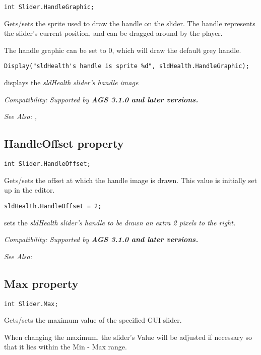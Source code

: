 \begin{verbatim}
int Slider.HandleGraphic;
\end{verbatim}
Gets/sets the sprite used to draw the handle on the slider. The handle represents the
slider's current position, and can be dragged around by the player.

The handle graphic can be set to 0, which will draw the default grey handle.

\begin{verbatim}
Display("sldHealth's handle is sprite %d", sldHealth.HandleGraphic);
\end{verbatim}
displays the \it{sldHealth} slider's handle image

\it{Compatibility:} Supported by \bf{AGS 3.1.0} and later versions.

\it{See Also:} ,


\subsection{HandleOffset property}\label{Slider.HandleOffset}%

\begin{verbatim}
int Slider.HandleOffset;
\end{verbatim}
Gets/sets the offset at which the handle image is drawn. This value is initially
set up in the editor.

\begin{verbatim}
sldHealth.HandleOffset = 2;
\end{verbatim}
sets the \it{sldHealth} slider's handle to be drawn an extra 2 pixels to the right.

\it{Compatibility:} Supported by \bf{AGS 3.1.0} and later versions.

\it{See Also:} 


\subsection{Max property}\label{Slider.Max}%

\begin{verbatim}
int Slider.Max;
\end{verbatim}
Gets/sets the maximum value of the specified GUI slider.

When changing the maximum, the slider's Value will be adjusted if
necessary so that it lies within the Min - Max range.

